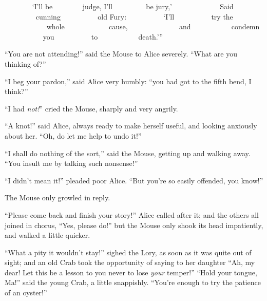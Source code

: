 \documentclass[11pt,openany,oneside]{book}
\begin{document}
{\small {\ttfamily ~~~~~~~ ‘I’ll be }}\newline
{\small {\ttfamily ~~~~~~~ judge, I’ll }}\newline
{\small {\ttfamily ~~~~~~~~ be jury,’ }}\newline
{\small {\ttfamily ~~~~~~~~~~~~ Said }}\newline
{\small {\ttfamily ~~~~~~~~ cunning }}\newline
{\small {\ttfamily ~~~~~~~~~ old Fury: }}\newline
{\small {\ttfamily ~~~~~~~~~ ‘I’ll }}\newline
{\small {\ttfamily ~~~~~~~~~ try the }}\newline
{\small {\ttfamily ~~~~~~~~~~~ whole }}\newline
{\small {\ttfamily ~~~~~~~~~~~ cause, }}\newline
{\small {\ttfamily ~~~~~~~~~~~~~ and }}\newline
{\small {\ttfamily ~~~~~~~~~~ condemn }}\newline
{\small {\ttfamily ~~~~~~~~~~ you }}\newline
{\small {\ttfamily ~~~~~~~~~ to }}\newline
{\small {\ttfamily ~~~~~~~~~~ death.’” }}

“You are not attending!” said the Mouse to Alice severely. “What are you thinking of?” 

“I beg your pardon,” said Alice very humbly: “you had got to the fifth bend, I think?” 

“I had {\em not!\/}” cried the Mouse, sharply and very angrily. 

“A knot!” said Alice, always ready to make herself useful, and looking anxiously about her. “Oh, do let me help to undo it!” 

“I shall do nothing of the sort,” said the Mouse, getting up and walking away. “You insult me by talking such nonsense!” 

“I didn’t mean it!” pleaded poor Alice. “But you’re so easily offended, you know!” 

The Mouse only growled in reply. 

“Please come back and finish your story!” Alice called after it; and the others all joined in chorus, “Yes, please do!” but the Mouse only shook its head impatiently, and walked a little quicker. 

“What a pity it wouldn’t stay!” sighed the Lory, as soon as it was quite out of sight; and an old Crab took the opportunity of saying to her daughter “Ah, my dear! Let this be a lesson to you never to lose {\em your\/} temper!” “Hold your tongue, Ma!” said the young Crab, a little snappishly. “You’re enough to try the patience of an oyster!” 
\end{document}

